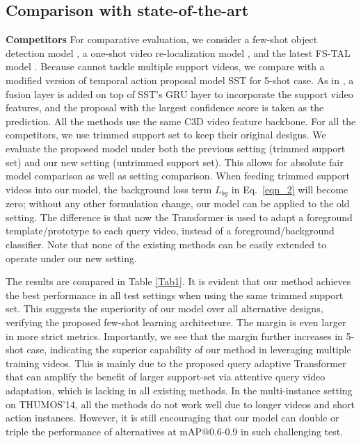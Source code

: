 \documentclass{bmvc2k}
\begin{document}
\subsection{Comparison with state-of-the-art} 
{\bf Competitors }
For comparative evaluation, we consider a few-shot object detection model \cite{hu2019silco}, 
a one-shot video re-localization model \cite{feng2018video},
and the latest FS-TAL model \cite{yang2020localizing}.
Because \cite{feng2018video} cannot tackle multiple support videos, we compare with a modified version of temporal action proposal model SST \cite{buch2017sst} for 5-shot case. As in \cite{yang2020localizing}, a fusion layer is added on top of SST's GRU layer to incorporate the support video features, and the proposal with the largest confidence score is taken as the prediction.
All the methods use the same C3D video feature backbone.
For all the competitors,
we use trimmed support set to keep their original designs.
We evaluate the proposed model under both the previous setting (trimmed support set) and our new setting (untrimmed support set). 
This allows for absolute fair model comparison as well as
setting comparison.
When feeding trimmed support videos into our model, 
the background loss term $L_{bg}$ in Eq.~\eqref{eqn_2} will become zero; without any other formulation change, our model can be applied to the old setting. The difference is that now the Transformer is used to adapt a foreground template/prototype to each query video, instead of a foreground/background classifier. Note that none of the existing methods can be easily extended to operate under our new setting.




The results are compared in Table \ref{Tab1}.
It is evident that our method achieves the best performance in all test settings when using the same trimmed support set. 
This suggests the superiority of our model over all alternative designs, verifying the proposed few-shot learning architecture.
The margin is even larger in more strict metrics.
Importantly, we see that the margin further 
increases in 5-shot case, indicating the superior capability of our method in leveraging multiple training videos.
This is mainly due to the proposed query adaptive Transformer that can amplify the benefit of larger support-set
via attentive query video adaptation,
 which is lacking in all existing methods.
In the multi-instance setting on THUMOS'14,
all the methods do not work well due to longer videos
and short action instances.
However, it is still encouraging that our model can double or triple the performance of alternatives at mAP@0.6-0.9
in such challenging test.
\end{document}

